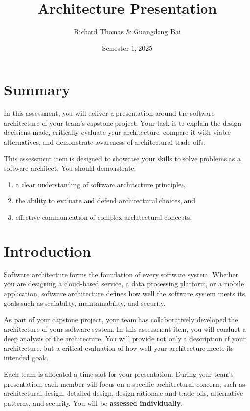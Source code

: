 \documentclass{csse4400}
\title{Architecture Presentation}
\author{Richard Thomas \& Guangdong Bai}
\date{Semester 1, 2025}
\begin{document}

\maketitle

\section*{Summary}

In this assessment, you will deliver a presentation around the software architecture of your team's capstone project.
Your task is to explain the design decisions made, critically evaluate your architecture, compare it with viable alternatives, and demonstrate awareness of architectural trade-offs.

This assessment item is designed to showcase your skills to solve problems as a software architect. You should demonstrate:
\begin{enumerate}
    \item a clear understanding of software architecture principles,
    \item the ability to evaluate and defend architectural choices, and
    \item effective communication of complex architectural concepts.
\end{enumerate}


\section{Introduction}

Software architecture forms the foundation of every software system. Whether you are designing a cloud-based service, a data processing platform, or a mobile application, software architecture defines how well the software system meets its goals such as scalability, maintainability, and security.

As part of your capstone project, your team has collaboratively developed the architecture of your software system.
In this assessment item, you will conduct a deep analysis of the architecture.
You will provide not only a description of your architecture, but a critical evaluation of how well your architecture meets its intended goals.

Each team is allocated a time slot for your presentation.
During your team's presentation, each member will focus on a specific architectural concern, such as architectural design, detailed design, design rationale and trade-offs, alternative patterns, and security.
You will be \textbf{assessed individually}.
\end{document}
